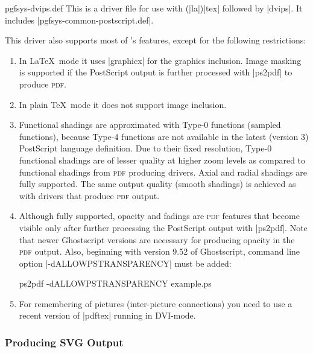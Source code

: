\begin{filedescription}{pgfsys-dvips.def}
    This is a driver file for use with (|la|)|tex| followed by |dvips|. It
    includes |pgfsys-common-postscript.def|.

    This driver also supports most of \pgfname's features, except for the
    following restrictions:
    \begin{enumerate}
        \item In \LaTeX\ mode it uses |graphicx| for the graphics inclusion.
            Image masking is supported if the PostScript output is further
            processed with |ps2pdf| to produce \textsc{pdf}.
        \item In plain \TeX\ mode it does not support image inclusion.
        \item Functional shadings are approximated with Type-0 functions
            (sampled functions), because Type-4 functions are not available in
            the latest (version 3) PostScript language definition. Due to
            their fixed resolution, Type-0 functional shadings are of lesser
            quality at higher zoom levels as compared to functional shadings
            from \textsc{pdf} producing drivers. Axial and radial shadings are
            fully supported. The same output quality (smooth shadings) is
            achieved as with drivers that produce \textsc{pdf} output.
        \item Although fully supported, opacity and fadings are \textsc{pdf}
            features that become visible only after further processing the
            PostScript output with |ps2pdf|. Note that newer Ghostscript
            versions are necessary for producing opacity in the \textsc{pdf}
            output. Also, beginning with version 9.52 of Ghostscript, command
            line option |-dALLOWPSTRANSPARENCY| must be added:
\begin{codeexample}
ps2pdf -dALLOWPSTRANSPARENCY example.ps
\end{codeexample}
        \item For remembering of pictures (inter-picture connections) you
            need to use a recent version of |pdftex| running in DVI-mode.
    \end{enumerate}
\end{filedescription}


\subsubsection{Producing SVG Output}

